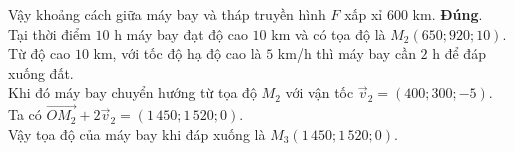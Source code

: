 \begin{ex}
{\begin{itemchoice}
			Vậy khoảng cách giữa máy bay và tháp truyền hình $F$ xấp xỉ $600$ km.
			\itemch \textbf{Đúng}.\\
			Tại thời điểm $10$ h máy bay đạt độ cao $10$ km và có tọa độ là $M_2(650;920;10)$.\\
			Từ độ cao $10$ km, với tốc độ hạ độ cao là $5$ km/h thì máy bay cần $2$ h để đáp xuống đất.\\
			Khi đó máy bay chuyển hướng từ tọa độ $M_2$ với vận tốc $\overrightarrow{v}_2=(400;300;-5)$.\\
			Ta có $\overrightarrow{OM_2}+2\overrightarrow{v}_2=(1\,450;1\,520;0)$.\\ 
			Vậy tọa độ của máy bay khi đáp xuống là $M_3(1\,450;1\,520;0)$.
	\end{itemchoice}
}
\end{ex}

